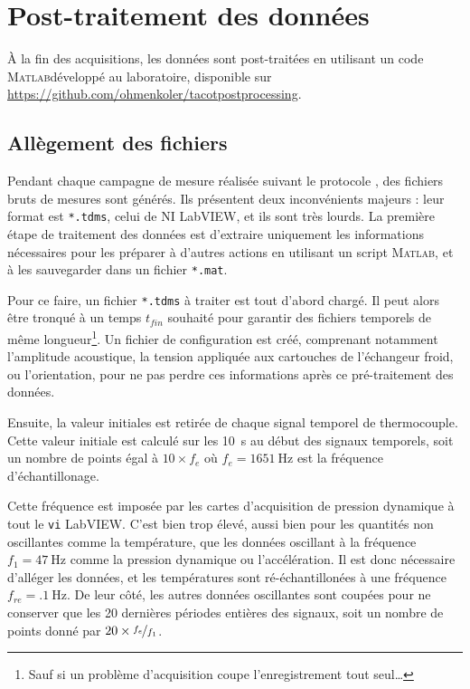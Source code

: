 \section{Post-traitement des données}
À la fin des acquisitions, les données sont post-traitées en utilisant un code \textsc{Matlab}\textss\textregistered développé au laboratoire, disponible sur \url{https://github.com/ohmenkoler/tacotpostprocessing}.

\subsection{Allègement des fichiers}
Pendant chaque campagne de mesure réalisée suivant le protocole , des fichiers bruts de mesures sont générés. Ils présentent deux inconvénients majeurs : leur format est \texttt{*.tdms}, celui de NI LabVIEW, et ils sont très lourds. La première étape de traitement des données est d'extraire uniquement les informations nécessaires pour les préparer à d'autres actions en utilisant un script \textsc{Matlab}\textss\textregistered, et à les sauvegarder dans un fichier \texttt{*.mat}.\medskip

Pour ce faire, un fichier \texttt{*.tdms} à traiter est tout d'abord chargé. Il peut alors être tronqué à un temps $t_{fin}$ souhaité pour garantir des fichiers temporels de même longueur\footnote{Sauf si un problème d'acquisition coupe l'enregistrement tout seul\dots}. Un fichier de configuration est créé, comprenant notamment l'amplitude acoustique, la tension appliquée aux cartouches de l'échangeur froid, ou l'orientation, pour ne pas perdre ces informations après ce pré-traitement des données.\smallskip

Ensuite, la valeur initiales est retirée de chaque signal temporel de thermocouple. Cette valeur initiale est calculé sur les \qty{10}{\second} au début des signaux temporels, soit un nombre de points égal à $10 \times f_{e}$ où $f_{e}=\qty{1651}{\hertz}$ est la fréquence d'échantillonage.\smallskip

Cette fréquence est imposée par les cartes d'acquisition de pression dynamique à tout le \texttt{vi} LabVIEW. C'est bien trop élevé, aussi bien pour les quantités non oscillantes comme la température, que les données oscillant à la fréquence $f_1=\qty{47}{\hertz}$ comme la pression dynamique ou l'accélération. Il est donc nécessaire d'alléger les données, et les températures sont ré-échantillonées à une fréquence $f_{re}=\qty{.1}{\hertz}$. De leur côté, les autres données oscillantes sont coupées pour ne conserver que les \num{20} dernières périodes entières des signaux, soit un nombre de points donné par $20 \times \nicefrac{f_e}{f_1}$.\smallskip

